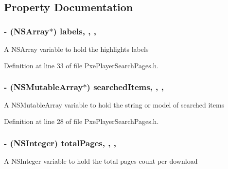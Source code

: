 \subsection{Property Documentation}
\hypertarget{interface_pxe_player_search_pages_a54907b85c2fa2e242a3032a7ff4b6bc5}{
\subsubsection[{labels}]{\setlength{\rightskip}{0pt plus 5cm}-\/ (N\-S\-Array$\ast$) labels\hspace{0.3cm}{\ttfamily [read]}, {\ttfamily [write]}, {\ttfamily [nonatomic]}, {\ttfamily [strong]}}}\label{interface_pxe_player_search_pages_a54907b85c2fa2e242a3032a7ff4b6bc5}
A N\-S\-Array variable to hold the highlights labels 

Definition at line 33 of file Pxe\-Player\-Search\-Pages.\-h.

\hypertarget{interface_pxe_player_search_pages_ab512213e84c5e0d03c73c7c86e74e903}{
\subsubsection[{searched\-Items}]{\setlength{\rightskip}{0pt plus 5cm}-\/ (N\-S\-Mutable\-Array$\ast$) searched\-Items\hspace{0.3cm}{\ttfamily [read]}, {\ttfamily [write]}, {\ttfamily [nonatomic]}, {\ttfamily [strong]}}}\label{interface_pxe_player_search_pages_ab512213e84c5e0d03c73c7c86e74e903}
A N\-S\-Mutable\-Array variable to hold the string or model of searched items 

Definition at line 28 of file Pxe\-Player\-Search\-Pages.\-h.

\hypertarget{interface_pxe_player_search_pages_ada69e63edca53b5ecf862d1b0568453e}{
\subsubsection[{total\-Pages}]{\setlength{\rightskip}{0pt plus 5cm}-\/ (N\-S\-Integer) total\-Pages\hspace{0.3cm}{\ttfamily [read]}, {\ttfamily [write]}, {\ttfamily [nonatomic]}, {\ttfamily [assign]}}}\label{interface_pxe_player_search_pages_ada69e63edca53b5ecf862d1b0568453e}
A N\-S\-Integer variable to hold the total pages count per download 

